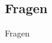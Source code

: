 \documentclass{beamer}
\begin{document}
\subsection*{Fragen}
\begin{frame}
	\begin{center}
	\huge{Fragen}
	\end{center}
\end{frame}


%
%
\end{document}
